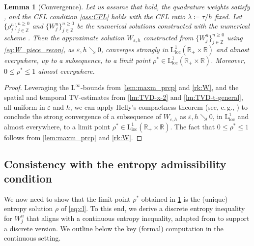 \documentclass[10pt]{amsart}
\theoremstyle{plain}
\newtheorem{lemma}{Lemma}[section]
\theoremstyle{definition}
\numberwithin{equation}{section}
\newcommand{\R}{\mathbb{R}}
\newcommand{\eps}{{\varepsilon}}
\begin{document}
\begin{lemma}[Convergence] \label{lm:limit}
Let us assume that  hold, the quadrature weights satisfy , and the CFL condition \cref{ass:CFL} holds with the CFL ratio $\lambda\coloneqq \tau/h$ fixed. Let $\{\rho_j^n\}_{j\in\mathbb{Z}}^{n\geq0}$ and $\{W_j^n\}_{j\in\mathbb{Z}}^{n\geq0}$ be the numerical solutions constructed with the numerical scheme . Then the approximate solution $W_{\eps,h}$ constructed from $\{W_j^n\}_{j\in\mathbb{Z}}^{n\geq0}$ using \cref{eq:W_piece_recon}, as $\eps,h \searrow 0$, converges strongly in $\mathrm{L}^1_{\mathrm{loc}}(\R_+\times \R)$ and almost everywhere, up to a subsequence, to a limit point $\rho^*\in \mathrm{L}^1_{\mathrm{loc}}(\R_+\times \R)$. Moreover, $0 \le \rho^* \le 1$ almost everywhere.  
\end{lemma}

\begin{proof}
Leveraging the $\mathrm{L}^\infty$-bounds from \cref{lem:maxm_prcp} and \cref{rk:W}, and the spatial and temporal TV-estimates from \cref{lm:TVD-x-2} and \cref{lm:TVD-t-general}, all uniform in $\varepsilon$ and $h$, we can apply Helly's compactness theorem (see, e.\,g., \cite[Theorem 2.3, p.~14]{MR1816648}) to conclude the strong convergence of a subsequence of $W_{\eps,h}$ as $\eps,h \searrow 0$, in $\mathrm{L}^1_{\mathrm{loc}}$ and almost everywhere, to a limit point $\rho^*\in \mathrm{L}^1_{\mathrm{loc}}(\R_+\times \R)$. The fact that $0 \le \rho^* \le 1$ follows from \cref{lem:maxm_prcp} and \cref{rk:W}.
\end{proof}


\subsection{Consistency with the entropy admissibility condition}
\label{ssec:entropy-consistency-2}

We now need to show that the limit point $\rho^*$ obtained in \cref{lm:limit} is the (unique) entropy solution $\rho$ of \cref{eq:cl}.
To this end, we derive a discrete entropy inequality for $W^n_j$ that aligns with a continuous entropy inequality, adapted from \cite{MR4553943} to support a discrete version.
We outline below the key (formal) computation in the continuous setting.
\end{document}
